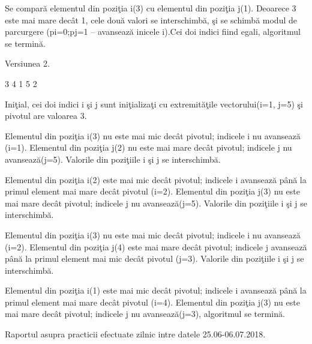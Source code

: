 \documentclass{report}
\begin{document}
Se compară elementul din poziţia i(3) cu elementul din poziţia j(1). Deoarece 3 este mai mare
decât 1, cele două valori se interschimbă, şi se schimbă modul de parcurgere (pi=0;pj=1 –
avansează inicele i).Cei doi indici fiind egali, algoritmul se termină.

Versiunea 2.

3 4 1 5 2 

Iniţial, cei doi indici i şi j sunt iniţializaţi cu extremităţile vectorului(i=1, j=5) şi pivotul are valoarea 3.

Elementul din poziţia i(3) nu este mai mic decât pivotul; indicele i nu avansează (i=1). Elementul
din poziţia j(2) nu este mai mare decât pivotul; indicele j nu avansează(j=5). Valorile din poziţiile i
şi j se interschimbă.

Elementul din poziţia i(2) este mai mic decât pivotul; indicele i avansează până la primul element
mai mare decât pivotul (i=2). Elementul din poziţia j(3) nu este mai mare decât pivotul; indicele j
nu avansează(j=5). Valorile din poziţiile i şi j se interschimbă.

Elementul din poziţia i(3) nu este mai mic decât pivotul; indicele i nu avansează (i=2). Elementul
din poziţia j(4) este mai mare decât pivotul; indicele j avansează până la primul element mai mic
decât pivotul (j=3). Valorile din poziţiile i şi j se interschimbă.

Elementul din poziţia i(1) este mai mic decât pivotul; indicele i avansează până la primul element
mai mare decât pivotul (i=4). Elementul din poziţia j(3) nu este mai mare decât pivotul; indicele j
nu avansează(j=3), algoritmul se termină.

\vskip 0.5cm
Raportul asupra practicii efectuate zilnic intre datele 25.06-06.07.2018. 
\end{document}
